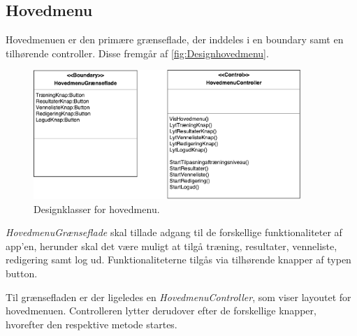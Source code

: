 \subsection*{Hovedmenu} \label{sec:MVCHovedmenu}
Hovedmenuen er den primære grænseflade, der inddeles i en boundary samt en tilhørende controller. Disse fremgår af \autoref{fig:Designhovedmenu}.

\begin{figure} [H]
\centering
\includegraphics[width=0.9\textwidth]{figures/MVC/MVCHovedmenu}
\caption{Designklasser for hovedmenu.}
\label{fig:Designhovedmenu}
\end{figure}

\noindent
\textit{HovedmenuGrænseflade} skal tillade adgang til de forskellige funktionaliteter af app’en, herunder skal det være muligt at tilgå træning, resultater, venneliste, redigering samt log ud. Funktionaliteterne tilgås via tilhørende knapper af typen button. 

Til grænsefladen er der ligeledes en \textit{HovedmenuController}, som viser layoutet for hovedmenuen. Controlleren lytter derudover efter de forskellige knapper, hvorefter den respektive metode startes.  
